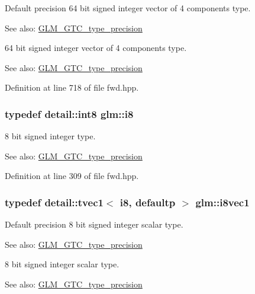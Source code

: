 Default precision 64 bit signed integer vector of 4 components type. \begin{Desc}
\item[See also:]\hyperlink{group__gtc__type__precision}{GLM\_\-GTC\_\-type\_\-precision}\end{Desc}
64 bit signed integer vector of 4 components type. \begin{Desc}
\item[See also:]\hyperlink{group__gtc__type__precision}{GLM\_\-GTC\_\-type\_\-precision} \end{Desc}


Definition at line 718 of file fwd.hpp.\hypertarget{group__gtc__type__precision_gae064be68b7d36cd7910c16e8ad18bba}{
\subsubsection[i8]{\setlength{\rightskip}{0pt plus 5cm}typedef detail::int8 {\bf glm::i8}}}
\label{group__gtc__type__precision_gae064be68b7d36cd7910c16e8ad18bba}


8 bit signed integer type. \begin{Desc}
\item[See also:]\hyperlink{group__gtc__type__precision}{GLM\_\-GTC\_\-type\_\-precision} \end{Desc}


Definition at line 309 of file fwd.hpp.\hypertarget{group__gtc__type__precision_ge67d2e1e7ebd1a79176cac554395b881}{
\subsubsection[i8vec1]{\setlength{\rightskip}{0pt plus 5cm}typedef detail::tvec1$<$ i8, defaultp $>$ {\bf glm::i8vec1}}}
\label{group__gtc__type__precision_ge67d2e1e7ebd1a79176cac554395b881}


Default precision 8 bit signed integer scalar type. \begin{Desc}
\item[See also:]\hyperlink{group__gtc__type__precision}{GLM\_\-GTC\_\-type\_\-precision}\end{Desc}
8 bit signed integer scalar type. \begin{Desc}
\item[See also:]\hyperlink{group__gtc__type__precision}{GLM\_\-GTC\_\-type\_\-precision} \end{Desc}


